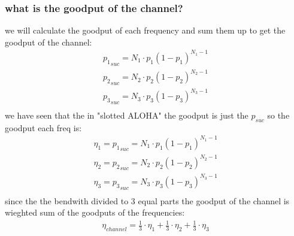\documentclass{article}
\begin{document}
\subsubsection{what is the goodput of the channel?}
we will calculate the goodput of each frequency and sum them up to get the goodput of the channel:
\begin{equation}
    \begin{aligned}
        {p_1}_{suc} = N_1 \cdot p_1 ( 1-p_1)^{N_1-1}\\
        {p_2}_{suc} = N_2 \cdot p_2 ( 1-p_2)^{N_2-1}\\
        {p_3}_{suc} = N_3 \cdot p_3 ( 1-p_3)^{N_3-1}\\
    \end{aligned}
\end{equation}
we have seen that the in "slotted ALOHA" the goodput is just the $p_{suc}$ so the goodput each freq is:
\begin{equation}
    \begin{aligned}
        \eta_1 ={p_1}_{suc} = N_1 \cdot p_1 ( 1-p_1)^{N_1-1}\\
        \eta_2 ={p_2}_{suc} = N_2 \cdot p_2 ( 1-p_2)^{N_2-1}\\
        \eta_3 ={p_3}_{suc} = N_3 \cdot p_3 ( 1-p_3)^{N_3-1}\\
    \end{aligned}
\end{equation}
since the the bendwith divided to 3 equal parts the goodput of the channel is wieghted sum of the goodputs of the frequencies:
\begin{equation}
    \begin{aligned}
        \eta_{channel} = \frac13 \cdot \eta_1 + \frac13 \cdot \eta_2 + \frac13 \cdot \eta_3
    \end{aligned}
\end{equation}
\end{document}
